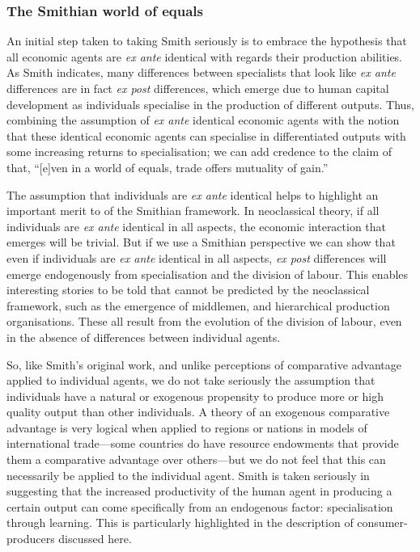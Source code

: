 \subsubsection{The Smithian world of equals}

An initial step taken to taking Smith seriously is to embrace the hypothesis that all economic agents are \textit{ex ante} identical with regards their production abilities. As Smith indicates, many differences between specialists that look like \textit{ex ante} differences are in fact \textit{ex post} differences, which emerge due to human capital development as individuals specialise in the production of different outputs. Thus, combining the assumption of \textit{ex ante} identical economic agents with the notion that these identical economic agents can specialise in differentiated outputs with some increasing returns to specialisation; we can add credence to the claim of \citet[p.~43]{BuchananYoon2000} that, ``[e]ven in a world of equals, trade offers mutuality of gain.''

The assumption that individuals are \textit{ex ante} identical helps to highlight an important merit to of the Smithian framework. In neoclassical theory, if all individuals are \textit{ex ante} identical in all aspects, the economic interaction that emerges will be trivial. But if we use a Smithian perspective we can show that even if individuals are \textit{ex ante} identical in all aspects, \textit{ex post} differences will emerge endogenously from specialisation and the division of labour. This enables interesting stories to be told that cannot be predicted by the neoclassical framework, such as the emergence of middlemen, and hierarchical production organisations. These all result from the evolution of the division of labour, even in the absence of differences between individual agents.

So, like Smith's original work, and unlike perceptions of comparative advantage applied to individual agents, we do not take seriously the assumption that individuals have a natural or exogenous propensity to produce more or high quality output than other individuals. A theory of an exogenous comparative advantage is very logical when applied to regions or nations in models of international trade---some countries do have resource endowments that provide them a comparative advantage over others---but we do not feel that this can necessarily be applied to the individual agent. Smith is taken seriously in suggesting that the increased productivity of the human agent in producing a certain output can come specifically from an endogenous factor: specialisation through learning. This is particularly highlighted in the description of consumer-producers discussed here. 

